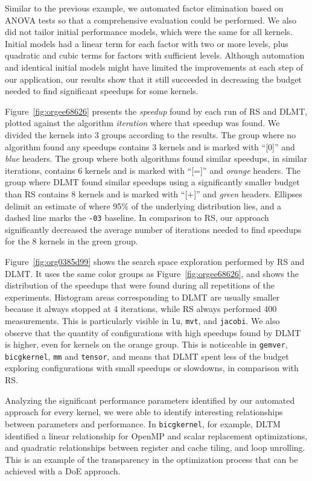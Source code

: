 \documentclass[conference]{IEEEtran}
\begin{document}
Similar to the previous example, we automated factor elimination based on ANOVA
tests so that a comprehensive evaluation could be performed. We also did not
tailor initial performance models, which were the same for all kernels. Initial
models had a linear term for each factor with two or more levels, plus quadratic
and cubic terms for factors with sufficient levels. Although automation and
identical initial models might have limited the improvements at each step of our
application, our results show that it still succeeded in decreasing the budget
needed to find significant speedups for some kernels.

Figure~\ref{fig:orgee68626} presents the \emph{speedup} found by each
run of RS and DLMT, plotted against the algorithm \emph{iteration} where that speedup
was found. We divided the kernels into 3 groups according to the results. The
group where no algorithm found any speedups contains 3 kernels and is marked
with ``[0]'' and \emph{blue} headers. The group where both algorithms found similar
speedups, in similar iterations, contains 6 kernels and is marked with ``[=]''
and \emph{orange} headers. The group where DLMT found similar speedups using a
significantly smaller budget than RS contains 8 kernels and is marked with
``[+]'' and \emph{green} headers. Ellipses delimit an estimate of where 95\% of the
underlying distribution lies, and a dashed line marks the \texttt{-03} baseline.
In comparison to RS, our approach significantly decreased the average number of
iterations needed to find speedups for the 8 kernels in the green group.

Figure~\ref{fig:org0385d99} shows the search space exploration performed
by RS and DLMT. It uses the same color groups as
Figure~\ref{fig:orgee68626}, and shows the distribution of the
speedups that were found during all repetitions of the experiments. Histogram
areas corresponding to DLMT are usually smaller because it always stopped at 4
iterations, while RS always performed 400 measurements. This is particularly
visible in \texttt{lu}, \texttt{mvt}, and \texttt{jacobi}. We also observe that the quantity of
configurations with high speedups found by DLMT is higher, even for kernels on
the orange group. This is noticeable in \texttt{gemver}, \texttt{bicgkernel}, \texttt{mm} and
\texttt{tensor}, and means that DLMT spent less of the budget exploring
configurations with small speedups or slowdowns, in comparison with RS.

Analyzing the significant performance parameters identified by our automated
approach for every kernel, we were able to identify interesting relationships
between parameters and performance. In \texttt{bicgkernel}, for example, DLTM
identified a linear relationship for OpenMP and scalar replacement
optimizations, and quadratic relationships between register and cache tiling,
and loop unrolling. This is an example of the transparency in the optimization
process that can be achieved with a DoE approach.
\end{document}
